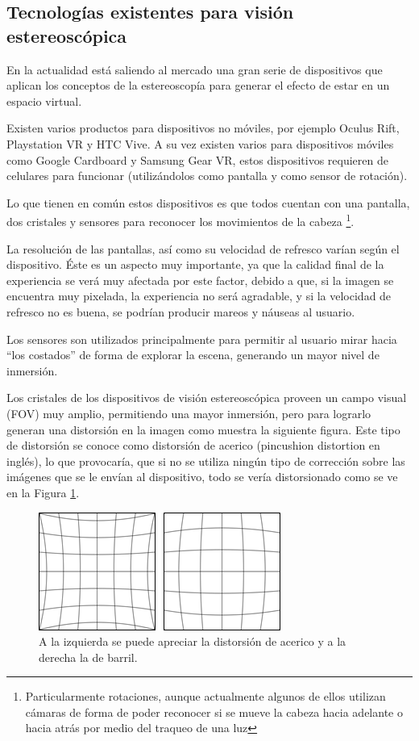 \documentclass[12pt]{article}
\begin{document}
\subsection{Tecnologías existentes para visión estereoscópica}
\noindent En la actualidad está saliendo al mercado una gran serie de dispositivos que aplican los conceptos de la estereoscopía para generar el efecto de estar en un espacio virtual.

Existen varios productos para dispositivos no móviles, por ejemplo  Oculus Rift\cite{oculus}, Playstation VR\cite{psvr} y HTC Vive\cite{htcvive}. A su vez existen varios para dispositivos móviles como  Google Cardboard\cite{cardboard} y  Samsung Gear VR\cite{samsungvr}, estos dispositivos requieren de celulares para funcionar (utilizándolos como pantalla y como sensor de rotación).

Lo que tienen en común estos dispositivos es que todos cuentan con una pantalla, dos cristales y sensores para reconocer los movimientos de la cabeza \footnote{Particularmente rotaciones, aunque actualmente algunos de ellos utilizan cámaras de forma de poder reconocer si se mueve la cabeza hacia adelante o hacia atrás por medio del traqueo de una luz}.

La resolución de las pantallas, así como su velocidad de refresco varían según el dispositivo. Éste es un aspecto muy importante, ya que la calidad final de la experiencia se verá muy afectada por este factor, debido a que, si la imagen se encuentra muy pixelada, la experiencia no será agradable, y si la velocidad de refresco no es buena, se podrían producir mareos y náuseas al usuario.

Los sensores son utilizados principalmente para permitir al usuario mirar hacia “los costados” de forma de explorar la escena, generando un mayor nivel de inmersión.

Los cristales de los dispositivos de visión estereoscópica proveen un campo visual (FOV) muy amplio, permitiendo una mayor inmersión, pero para lograrlo generan una distorsión\cite{oculusrendering} en la imagen como muestra la siguiente figura. Este tipo de distorsión se conoce como  distorsión de acerico (pincushion distortion en inglés), lo que provocaría, que si no se utiliza ningún tipo de corrección sobre las imágenes que se le envían al dispositivo, todo se vería distorsionado como se ve en la Figura \ref{dist}.
\begin{figure}[h!]
\includegraphics[width =0.6\linewidth, center]{ace-bar.png}
\caption{ A la izquierda se puede apreciar la distorsión de acerico y a la derecha la de barril.}
\label{dist}
\end{figure}
\end{document}
